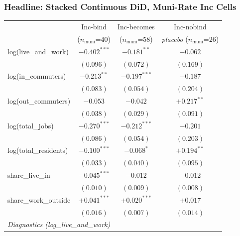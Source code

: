 \documentclass[xcolor = x11names, compress, aspectratio = 169]{beamer}
\begin{document}
    \begin{frame}
    \frametitle{Headline: Stacked Continuous DiD, Muni-Rate Inc Cells}
        \centering
        \scriptsize
        \renewcommand{\arraystretch}{1.05}
        \setlength{\tabcolsep}{6pt}
        \begin{tabular}{lccc}
            \toprule
            & Inc-bind & Inc-becomes & Inc-nobind \\
            & ($n_{\text{muni}}$=40) & ($n_{\text{muni}}$=58) & \emph{placebo} ($n_{\text{muni}}$=26) \\
            \midrule
            log(live\_and\_work)    & $\bm{-0.402^{***}}$ & $\bm{-0.181^{**}}$  & $-0.062$ \\
                                    & $(0.096)$           & $(0.072)$           & $(0.169)$ \\
            log(in\_commuters)      & $\bm{-0.213^{**}}$  & $\bm{-0.197^{***}}$ & $-0.187$ \\
                                    & $(0.083)$           & $(0.054)$           & $(0.204)$ \\
            log(out\_commuters)     & $-0.053$            & $-0.042$            & $+0.217^{**}$ \\
                                    & $(0.038)$           & $(0.029)$           & $(0.091)$ \\
            log(total\_jobs)        & $\bm{-0.270^{***}}$ & $\bm{-0.212^{***}}$ & $-0.201$ \\
                                    & $(0.086)$           & $(0.054)$           & $(0.203)$ \\
            log(total\_residents)   & $\bm{-0.100^{***}}$ & $-0.068^{*}$        & $+0.194^{**}$ \\
                                    & $(0.033)$           & $(0.040)$           & $(0.095)$ \\
            share\_live\_in         & $\bm{-0.045^{***}}$ & $-0.012$            & $-0.012$ \\
                                    & $(0.010)$           & $(0.009)$           & $(0.008)$ \\
            share\_work\_outside    & $\bm{+0.041^{***}}$ & $\bm{+0.020^{***}}$ & $+0.017$ \\
                                    & $(0.016)$           & $(0.007)$           & $(0.014)$ \\
            \midrule
            \multicolumn{4}{l}{\textit{Diagnostics (log\_live\_and\_work)}} \\

\end{tabular}
\end{frame}
\end{document}
